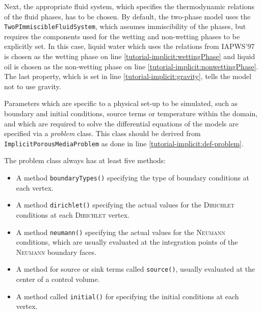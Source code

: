 Next, the appropriate fluid system, which specifies the thermodynamic
relations of the fluid phases, has to be chosen. By default, the
two-phase model uses the \texttt{TwoPImmiscibleFluidSystem}, which
assumes immiscibility of the phases, but requires the components
used for the wetting and non-wetting phases to be explicitly set. In
this case, liquid water which uses the relations from
IAPWS'97~\cite{IAPWS-HP} is chosen as the wetting phase on line
\ref{tutorial-implicit:wettingPhase} and liquid oil is chosen as the
non-wetting phase on line \ref{tutorial-implicit:nonwettingPhase}. The
last property, which is set in line \ref{tutorial-implicit:gravity},
tells the model not to use gravity.

\label{tutorial-implicit:boundaryStart}Parameters which are specific to a physical set-up to be simulated,
such as boundary and initial conditions, source terms or temperature
within the domain, and which are required to solve the differential
equations of the models are specified via a \textit{problem} class. This class
should be derived from \texttt{ImplicitPorousMediaProblem} as done in line
\ref{tutorial-implicit:def-problem}.

The problem class always has at least five methods:
\begin{itemize}
\item A method \texttt{boundaryTypes()} specifying the type of
  boundary conditions at each vertex.
\item A method \texttt{dirichlet()} specifying the actual values for
  the \textsc{Dirichlet} conditions at each \textsc{Dirichlet} vertex.
\item A method \texttt{neumann()} specifying the actual values for
  the \textsc{Neumann} conditions, which are usually evaluated at the
  integration points of the \textsc{Neumann} boundary faces.
\item A method for source or sink terms called \texttt{source()}, usually evaluated at
  the center of a control volume.
\item A method called \texttt{initial()} for specifying the initial
  conditions at each vertex.
\end{itemize}

